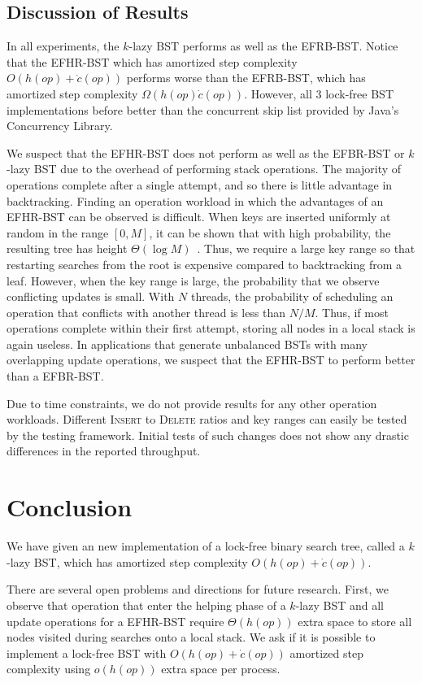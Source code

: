 \documentclass[letterpaper,twocolumn]{article}
\begin{document}
\subsection{Discussion of Results}
In all experiments, the $k$-lazy BST performs as well as the EFRB-BST. Notice that the EFHR-BST which has amortized step complexity $O(h(op) + \dot{c}(op))$ performs worse than the EFRB-BST, which has amortized step complexity $\Omega(h(op)\dot{c}(op))$. However, all 3 lock-free BST implementations before better than the concurrent skip list provided by Java's Concurrency Library. 

We suspect that the EFHR-BST does not perform as well as the EFBR-BST or $k$-lazy BST due to the overhead of performing stack operations. The majority of operations complete after a single attempt, and so there is little advantage in backtracking. Finding an operation workload in which the advantages of an EFHR-BST can be observed is difficult. When keys are inserted uniformly at random in the range $[0,M]$, it can be shown that with high probability, the resulting tree has height $\Theta(\log M)$~\cite{CLRS}. Thus, we require a large key range so that restarting searches from the root is expensive compared to backtracking from a leaf. However, when the key range is large, the probability that we observe conflicting updates is small. With $N$ threads, the probability of scheduling an operation  that conflicts with another thread is less than $N/M$. Thus, if most operations complete within their first attempt, storing all nodes in a local stack is again useless. In applications that generate unbalanced BSTs with many overlapping update operations, we suspect that the EFHR-BST to perform better than a EFBR-BST. 

Due to time constraints, we do not provide results for any other operation workloads. Different \textsc{Insert} to \textsc{Delete} ratios and key ranges can easily be tested by the testing framework. Initial tests of such changes does not show any drastic differences in the reported throughput.

\section{Conclusion}\label{section_conclusion}
We have given an new implementation of a lock-free binary search tree, called a $k$-lazy BST, which has amortized step complexity $O(h(op) + \dot{c}(op))$.

There are several open problems and directions for future research. First, we observe that operation that enter the helping phase of a $k$-lazy BST and all update operations for a EFHR-BST require $\Theta(h(op))$ extra space to store all nodes visited during searches onto a local stack. We ask if it is possible to implement a lock-free BST with $O(h(op) + \dot{c}(op))$ amortized step complexity using $o(h(op))$ extra space per process.
\end{document}
